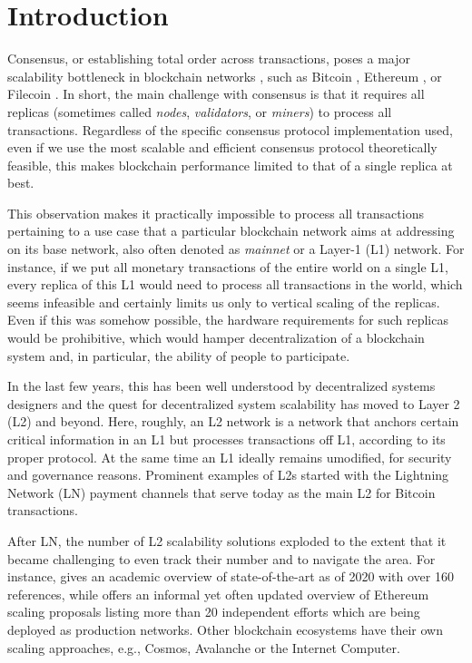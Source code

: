 \section{Introduction}
\label{sec:introduction}

Consensus, or establishing total order across \glspl{transaction}, poses a major scalability bottleneck in blockchain networks \cite{Vukolic15}, such as Bitcoin \cite{nakamoto2008bitcoin}, Ethereum \cite{wood2014ethereum}, or Filecoin \cite{filecoin}. In short, the main challenge with consensus is that it requires all \glspl{replica} (sometimes called \emph{nodes}, \emph{validators}, or \emph{miners}) to process all transactions. Regardless of the specific consensus protocol implementation used, even if we use the most scalable and efficient consensus protocol theoretically feasible, this makes blockchain performance limited to that of a single replica at best. 

This observation makes it practically impossible to process all transactions pertaining to a use case that a particular blockchain network aims at addressing on its base network, also often denoted as \emph{mainnet} or a Layer-1 (L1) network. For instance, if we put all monetary transactions of the entire world on a single L1, every replica of this L1 would need to process all transactions in the world, which seems infeasible and certainly limits us only to vertical scaling of the replicas. Even if this was somehow possible, the hardware requirements for such replicas would be prohibitive, which would hamper decentralization of a blockchain system \cite{Vukolic21} and, in particular, the ability of people to participate.

In the last few years, this has been well understood by decentralized systems designers and the quest for decentralized system scalability has moved to Layer 2 (L2) and beyond. Here, roughly, an L2 network is a network that anchors certain critical information in an L1 but processes transactions off L1, according to its proper protocol. At the same time an L1 ideally remains umodified, for security and governance reasons. Prominent examples of L2s started with the Lightning Network (LN) payment channels \cite{poon2016bitcoin} that serve today as the main L2 for Bitcoin transactions. 

After LN, the number of L2 scalability solutions exploded to the extent that it became challenging to even track their number and to navigate the area. For instance, \cite{Sok-L2} gives an academic overview of state-of-the-art as of 2020  with over 160 references, while \cite{l2beat} offers an informal yet often updated overview of Ethereum scaling proposals listing more than 20 independent efforts which are being deployed as production networks. Other blockchain ecosystems have their own scaling approaches, e.g., Cosmos, Avalanche or the Internet Computer. 

